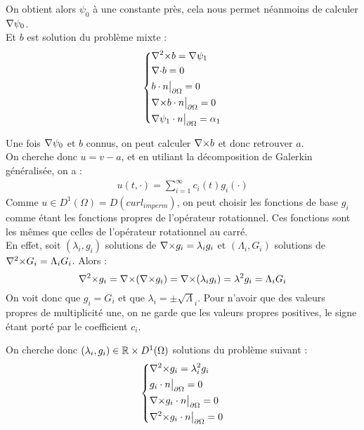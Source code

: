 On obtient alors $\psi_0$ à une constante près, cela nous permet néanmoins de calculer ${\nabla}\psi_0$.\\
Et $b$ est solution du problème mixte :
\begin{eqnarray}
\label{curlb}
\left\{
\begin{aligned}
&{\nabla^2\times} b = {\nabla}\psi_1\\
&{\nabla\cdot} b = 0\\
&b\cdot n{\big\rvert_{\partial\Omega}} = 0\\
&{\nabla\times} b\cdot n{\big\rvert_{\partial\Omega}} = 0\\
&{\nabla}\psi_1\cdot n{\big\rvert_{\partial\Omega}} = \alpha_1
\end{aligned}
\right.
\end{eqnarray}

Une fois ${\nabla}\psi_0$ et $b$ connus, on peut calculer ${\nabla\times} b$ et donc retrouver $a$.\\

On cherche donc $u=v-a$, et en utiliant la décomposition de Galerkin généralisée, on a :
\begin{eqnarray}
\label{u}
u(t,\cdot) = \sum_{i=1}^{\infty} c_i(t)g_i(\cdot)
\end{eqnarray}
Comme $u\in D^1(\Omega)=D(curl_{imperm})$, on peut choisir les fonctions de base $g_i$ comme étant les fonctions propres de l'opérateur rotationnel. Ces fonctions sont les mêmes que celles de l'opérateur rotationnel au carré.\\
En effet, soit $(\lambda_i,g_i)$ solutions de ${\nabla\times} g_i = \lambda_ig_i$ et $(\Lambda_i,G_i)$ solutions de ${\nabla^2\times} G_i = \Lambda_iG_i$. Alors :
\[
{\nabla^2\times} g_i = {\nabla\times}({\nabla\times} g_i)={\nabla\times}(\lambda_ig_i)=\lambda^2g_i = \Lambda_iG_i
\]
On voit donc que $g_i=G_i$ et que $\lambda_i=\pm\sqrt\Lambda_i$. Pour n'avoir que des valeurs propres de multiplicité une, on ne garde que les valeurs propres positives, le signe étant porté par le coefficient $c_i$.

On cherche donc $(\lambda_i,g_i)\in{\mathbb{R}}\times D^1(\Omega)$ solutions du problème suivant :
\begin{eqnarray}
\label{curlcurl}
\left\{
\begin{aligned}
&{\nabla^2\times}  g_i = \lambda_i^2 g_i\\
&g_i\cdot n{\big\rvert_{\partial\Omega}} = 0\\
&{\nabla\times} g_i\cdot n{\big\rvert_{\partial\Omega}} = 0\\
&{\nabla^2\times}  g_i\cdot n{\big\rvert_{\partial\Omega}} = 0
\end{aligned}
\right.
\end{eqnarray}

